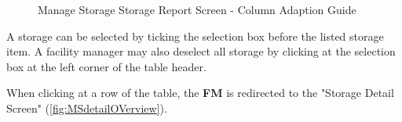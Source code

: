 \begin{figure}[htb] %
	\centering
    \hspace{5pt}
    
    \vspace{10pt}
    \caption{Manage Storage Storage Report Screen - Column Adaption Guide}
	\label{fig:MSstorageReportColumnAdaption}
\end{figure}

A storage can be selected by ticking the selection box before the listed storage item. A facility manager may also deselect all storage by clicking at the selection box at the left corner of the table header.

\bigskip

When clicking at a row of the table, the \textbf{FM} is redirected to the "Storage Detail Screen" (\autoref{fig:MSdetailOVerview}).


